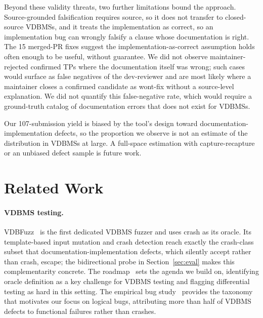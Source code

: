 \documentclass[sigconf]{acmart}
\begin{document}
Beyond these validity threats, two further limitations bound the approach. Source-grounded falsification requires source, so it does not transfer to closed-source VDBMSs, and it treats the implementation as correct, so an implementation bug can wrongly falsify a clause whose documentation is right. The 15 merged-PR fixes suggest the implementation-as-correct assumption holds often enough to be useful, without guarantee. We did not observe maintainer-rejected confirmed TPs where the documentation itself was wrong; such cases would surface as false negatives of the dev-reviewer and are most likely where a maintainer closes a confirmed candidate as wont-fix without a source-level explanation. We did not quantify this false-negative rate, which would require a ground-truth catalog of documentation errors that does not exist for VDBMSs.

Our 107-submission yield is biased by the tool's design toward documentation-implementation defects, so the proportion we observe is not an estimate of the distribution in VDBMSs at large. A full-space estimation with capture-recapture or an unbiased defect sample is future work.

\section{Related Work}
\label{sec:related}

\paragraph{VDBMS testing.}
VDBFuzz~\cite{vdbfuzz26} is the first dedicated VDBMS fuzzer and uses crash as its oracle. Its template-based input mutation and crash detection reach exactly the crash-class subset that documentation-implementation defects, which silently accept rather than crash, escape; the bidirectional probe in Section~\ref{sec:eval} makes this complementarity concrete. The roadmap~\cite{roadmap25} sets the agenda we build on, identifying oracle definition as a key challenge for VDBMS testing and flagging differential testing as hard in this setting. The empirical bug study~\cite{bugstudy25} provides the taxonomy that motivates our focus on logical bugs, attributing more than half of VDBMS defects to functional failures rather than crashes.
\end{document}
